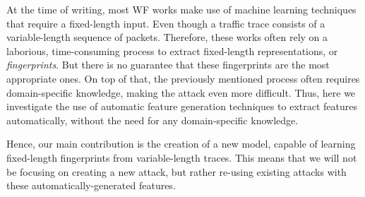 At the time of writing, most WF works make use of machine learning techniques that require a fixed-length input.
Even though a traffic trace consists of a variable-length sequence of packets.
Therefore, these works often rely on a laborious, time-consuming process to extract fixed-length representations, or \textit{fingerprints}.
But there is no guarantee that these fingerprints are the most appropriate ones.
On top of that, the previously mentioned process often requires domain-specific knowledge, making the attack even more difficult.
Thus, here we investigate the use of automatic feature generation techniques to extract features automatically, without the need for any domain-specific knowledge.

Hence, our main contribution is the creation of a new model, capable of learning fixed-length fingerprints from variable-length traces.
This means that we will not be focusing on creating a new attack, but rather re-using existing attacks with these automatically-generated features.
